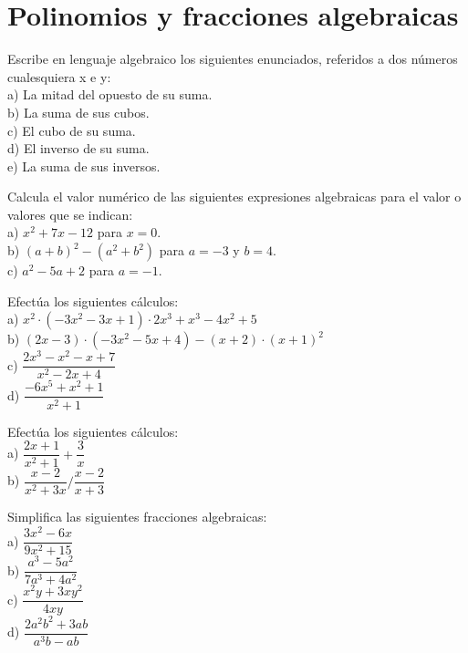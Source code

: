 
\section{Polinomios y fracciones algebraicas}

\begin{ejer}
Escribe en lenguaje algebraico los siguientes enunciados, referidos a dos números cualesquiera x e y: \\
a) La mitad del opuesto de su suma. \\
b) La suma de sus cubos. \\
c) El cubo de su suma. \\
d) El inverso de su suma. \\
e) La suma de sus inversos.
\end{ejer}

\begin{ejer}
Calcula el valor numérico de las siguientes expresiones algebraicas para el valor o valores que se indican: \\
a) $x^2 + 7x - 12$ para $x = 0$. \\
b) $(a + b)^2 - (a^2 + b^2)$ para $a = -3$ y $b = 4$. \\
c) $a^2 - 5a + 2$ para $a = -1$.
\end{ejer}

\begin{ejer}
Efectúa los siguientes cálculos: \\
a) $x^2\cdot (-3x^2-3x+1)\cdot 2x^3 +x^3-4x^2+5$ \\
b) $(2x-3)\cdot (-3x^2-5x+4) -(x+2)\cdot (x+1)^2$ \\
c) $\dfrac{2x^3-x^2-x+7}{x^2-2x+4}$ \\
d) $\dfrac{-6x^5+x^2+1}{x^2+1}$ \\
\end{ejer}

\begin{ejer}
Efectúa los siguientes cálculos: \\
a) $\dfrac{2x+1}{x^2+1}+\dfrac{3}{x}$ \\
b) $\dfrac{x-2}{x^2+3x} / \dfrac{x-2}{x+3}$
\end{ejer}

\begin{ejer}
Simplifica las siguientes fracciones algebraicas:\\
a) $\dfrac{3x^2-6x}{9x^2+15}$ \\
b) $\dfrac{a^3-5a^2}{7a^3+4a^2}$ \\
c) $\dfrac{x^2y+3xy^2}{4xy}$ \\
d) $\dfrac{2a^2b^2+3ab}{a^3b-ab}$
\end{ejer}

